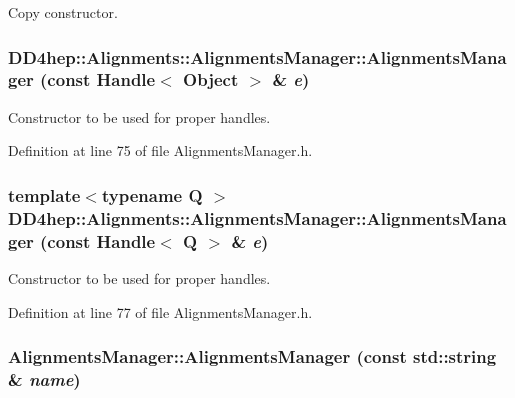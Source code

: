 Copy constructor. \hypertarget{class_d_d4hep_1_1_alignments_1_1_alignments_manager_ae474e7e6cf841aa616b181f106c2cf67}{
\subsubsection[{AlignmentsManager}]{\setlength{\rightskip}{0pt plus 5cm}DD4hep::Alignments::AlignmentsManager::AlignmentsManager (const {\bf Handle}$<$ {\bf Object} $>$ \& {\em e})}}
\label{class_d_d4hep_1_1_alignments_1_1_alignments_manager_ae474e7e6cf841aa616b181f106c2cf67}


Constructor to be used for proper handles. 

Definition at line 75 of file AlignmentsManager.h.\hypertarget{class_d_d4hep_1_1_alignments_1_1_alignments_manager_a3b9530d927c425ba4b96b952f7435877}{
\subsubsection[{AlignmentsManager}]{\setlength{\rightskip}{0pt plus 5cm}template$<$typename Q $>$ DD4hep::Alignments::AlignmentsManager::AlignmentsManager (const {\bf Handle}$<$ Q $>$ \& {\em e})}}
\label{class_d_d4hep_1_1_alignments_1_1_alignments_manager_a3b9530d927c425ba4b96b952f7435877}


Constructor to be used for proper handles. 

Definition at line 77 of file AlignmentsManager.h.\hypertarget{class_d_d4hep_1_1_alignments_1_1_alignments_manager_a3f12cc68d9ff6cc3aa240c1fde507fc6}{
\subsubsection[{AlignmentsManager}]{\setlength{\rightskip}{0pt plus 5cm}AlignmentsManager::AlignmentsManager (const std::string \& {\em name})}}
\label{class_d_d4hep_1_1_alignments_1_1_alignments_manager_a3f12cc68d9ff6cc3aa240c1fde507fc6}


